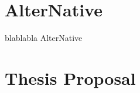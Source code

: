 


\section{AlterNative}\label{S:AlterNative}
blablabla AlterNative

\section{Thesis Proposal}\label{S:Thesis-Proposal}
